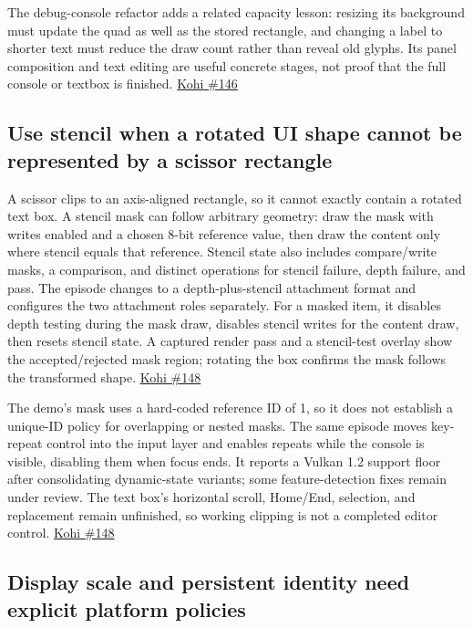 The debug-console refactor adds a related capacity lesson: resizing its background must update the quad as well as the stored rectangle, and changing a label to shorter text must reduce the draw count rather than reveal old glyphs. Its panel composition and text editing are useful concrete stages, not proof that the full console or textbox is finished. \href{https://www.youtube.com/watch?v=g7ZqqsMHZNo}{Kohi \#146}

\subsection{Use stencil when a rotated UI shape cannot be represented by a scissor rectangle}\label{05-engine-i-ch013-use-stencil-when-a-rotated-ui-shape-cannot-be-represented-by-a-scissor-rectangle}

A scissor clips to an axis-aligned rectangle, so it cannot exactly contain a rotated text box. A stencil mask can follow arbitrary geometry: draw the mask with writes enabled and a chosen 8-bit reference value, then draw the content only where stencil equals that reference. Stencil state also includes compare/write masks, a comparison, and distinct operations for stencil failure, depth failure, and pass. The episode changes to a depth-plus-stencil attachment format and configures the two attachment roles separately. For a masked item, it disables depth testing during the mask draw, disables stencil writes for the content draw, then resets stencil state. A captured render pass and a stencil-test overlay show the accepted/rejected mask region; rotating the box confirms the mask follows the transformed shape. \href{https://www.youtube.com/watch?v=_VDD8wzUMuY}{Kohi \#148}

The demo's mask uses a hard-coded reference ID of 1, so it does not establish a unique-ID policy for overlapping or nested masks. The same episode moves key-repeat control into the input layer and enables repeats while the console is visible, disabling them when focus ends. It reports a Vulkan 1.2 support floor after consolidating dynamic-state variants; some feature-detection fixes remain under review. The text box's horizontal scroll, Home/End, selection, and replacement remain unfinished, so working clipping is not a completed editor control. \href{https://www.youtube.com/watch?v=_VDD8wzUMuY}{Kohi \#148}

\subsection{Display scale and persistent identity need explicit platform policies}\label{05-engine-i-ch013-display-scale-and-persistent-identity-need-explicit-platform-policies}

